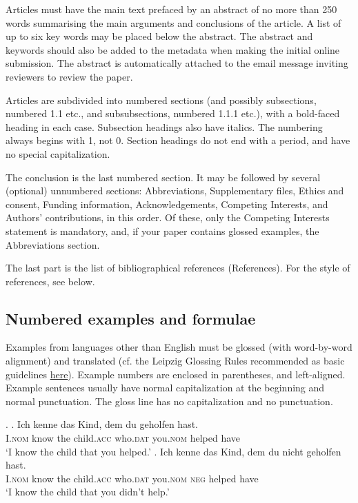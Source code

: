 \documentclass[charis,linguex,biblatex]{glossa}
\begin{document}
Articles must have the main text prefaced by an abstract of no more than 250 words summarising the main arguments and conclusions of the article. A list of up to six key words may be placed below the abstract. The abstract and keywords should also be added to the metadata when making the initial online submission. The abstract is automatically attached to the email message inviting reviewers to review the paper.

Articles are subdivided into numbered sections (and possibly subsections, numbered 1.1 etc., and subsubsections, numbered 1.1.1 etc.), with a bold-faced heading in each case. Subsection headings also have italics. The numbering always begins with 1, not 0. Section headings do not end with a period, and have no special capitalization.

The conclusion is the last numbered section. It may be followed by several (optional) unnumbered sections: Abbreviations, Supplementary files, Ethics and consent, Funding information,  Acknowledgements, Competing Interests, and Authors' contributions, in this order. Of these, only the Competing Interests statement is mandatory, and, if your paper contains glossed examples, the Abbreviations section.

The last part is the list of bibliographical references (References). For the style of references, see below.

\subsection{Numbered examples and formulae}

Examples from languages other than English must be glossed (with word-by-word alignment) and translated (cf. the Leipzig Glossing Rules recommended as basic guidelines \href{http://www.eva.mpg.de/lingua/resources/glossing-rules.php}{here}). Example numbers are enclosed in parentheses, and left-aligned. Example sentences usually have normal capitalization at the beginning and normal punctuation. The gloss line has no capitalization and no punctuation. 

\ex. \ag. Ich   kenne das Kind, dem du geholfen hast.\\
I.\textsc{nom} know the child.\textsc{acc} who.\textsc{dat} you.\textsc{nom} helped have\\
\glt `I know the child that you helped.'
\bg. Ich kenne das Kind, dem du nicht geholfen hast. \\
I.\textsc{nom} know  the child.\textsc{acc} who.\textsc{dat} you.\textsc{nom} \textsc{neg} helped   have\\
\glt `I know the child that you didn’t help.’
\end{document}
